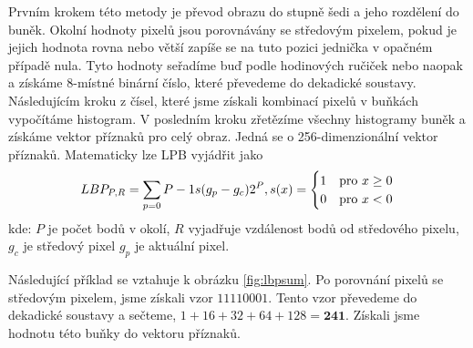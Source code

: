 Prvním krokem této metody je převod obrazu do stupně šedi a jeho rozdělení do buněk. Okolní hodnoty pixelů jsou porovnávány se středovým pixelem, pokud je jejich hodnota rovna nebo větší zapíše se na tuto pozici jednička v opačném případě nula. Tyto hodnoty seřadíme buď podle hodinových ručiček nebo naopak a získáme 8-místné binární číslo, které převedeme do dekadické soustavy. Následujícím kroku z čísel, které jsme získali kombinací pixelů v buňkách vypočítáme histogram. V posledním kroku zřetězíme všechny histogramy buněk a získáme vektor příznaků pro celý obraz. Jedná se o 256-dimenzionální vektor příznaků. 
Matematicky lze LPB vyjádřit jako
\begin{equation*}
LBP_{P,R} = \sum_{p=0}{P-1} s(g_p - g_c)2^P, \\
s(x) =
  \begin{cases} 
   1 & \text{pro } x \geq 0 \\
   0       & \text{pro } x < 0
  \end{cases}
\end{equation*}
kde: $P$ je počet bodů v okolí, $R$ vyjadřuje vzdálenost bodů od středového pixelu, $g_c$ je středový pixel $g_p$ je aktuální pixel. 

Následující příklad se vztahuje k obrázku \ref{fig:lbpsum}. Po porovnání pixelů se středovým pixelem, jsme získali vzor $11110001$. Tento vzor převedeme do dekadické soustavy a sečteme, $ 1+16+32+64+128 = \textbf{241}$. Získali jsme hodnotu této buňky do vektoru příznaků.

